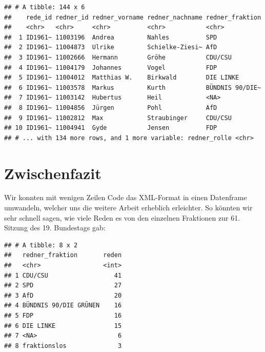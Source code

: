 \documentclass[oneside, 12pt, numbers=endperiod]{scrbook}
\newenvironment{Shaded}{\begin{snugshade}}{\end{snugshade}}
\newcommand{\DataTypeTok}[1]{\textcolor[rgb]{0.13,0.29,0.53}{#1}}
\newcommand{\KeywordTok}[1]{\textcolor[rgb]{0.13,0.29,0.53}{\textbf{#1}}}
\newcommand{\NormalTok}[1]{#1}
\newcommand{\OperatorTok}[1]{\textcolor[rgb]{0.81,0.36,0.00}{\textbf{#1}}}
\newcommand{\StringTok}[1]{\textcolor[rgb]{0.31,0.60,0.02}{#1}}
\theoremstyle{definition}
\theoremstyle{definition}
\theoremstyle{definition}
\theoremstyle{remark}
\begin{document}
\begin{verbatim}
## # A tibble: 144 x 6
##    rede_id redner_id redner_vorname redner_nachname redner_fraktion
##    <chr>   <chr>     <chr>          <chr>           <chr>          
##  1 ID1961~ 11003196  Andrea         Nahles          SPD            
##  2 ID1961~ 11004873  Ulrike         Schielke-Ziesi~ AfD            
##  3 ID1961~ 11002666  Hermann        Gröhe           CDU/CSU        
##  4 ID1961~ 11004179  Johannes       Vogel           FDP            
##  5 ID1961~ 11004012  Matthias W.    Birkwald        DIE LINKE      
##  6 ID1961~ 11003578  Markus         Kurth           BÜNDNIS 90/DIE~
##  7 ID1961~ 11003142  Hubertus       Heil            <NA>           
##  8 ID1961~ 11004856  Jürgen         Pohl            AfD            
##  9 ID1961~ 11002812  Max            Straubinger     CDU/CSU        
## 10 ID1961~ 11004941  Gyde           Jensen          FDP            
## # ... with 134 more rows, and 1 more variable: redner_rolle <chr>
\end{verbatim}

\hypertarget{zwischenfazit}{%
\section{Zwischenfazit}\label{zwischenfazit}}

Wir konnten mit wenigen Zeilen Code das XML-Format in einen Datenframe
umwandeln, welcher uns die weitere Arbeit erheblich erleichter. So
könnten wir sehr schnell sagen, wie viele Reden es von den einzelnen
Fraktionen zur 61. Sitzung des 19. Bundestags gab:

\begin{Shaded}
\end{Shaded}

\begin{verbatim}
## # A tibble: 8 x 2
##   redner_fraktion       reden
##   <chr>                 <int>
## 1 CDU/CSU                  41
## 2 SPD                      27
## 3 AfD                      20
## 4 BÜNDNIS 90/DIE GRÜNEN    16
## 5 FDP                      16
## 6 DIE LINKE                15
## 7 <NA>                      6
## 8 fraktionslos              3
\end{verbatim}
\end{document}
